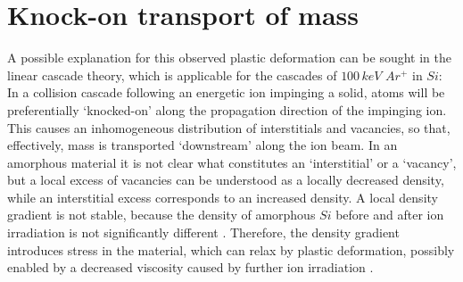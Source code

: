 \section{Knock-on transport of mass}

A possible explanation for this observed plastic deformation can be sought in the linear cascade theory, which is applicable for the cascades of $100\,keV\,\,Ar^+$ in $Si$: In a collision cascade following an energetic ion impinging a solid, atoms will be preferentially `knocked-on' along the propagation direction of the impinging ion. This causes an inhomogeneous distribution of interstitials and vacancies, so that, effectively, mass is transported `downstream' along the ion beam. In an amorphous material it is not clear what constitutes an `interstitial' or a `vacancy', but a local excess of vacancies can be understood as a locally decreased density, while an interstitial excess corresponds to an increased density. A local density gradient is not stable, because the density of amorphous $Si$ before and after ion irradiation is not significantly different \cite{pelaz_ion-beam-induced_2004}. Therefore, the density gradient introduces stress in the material, which can relax by plastic deformation, possibly enabled by a decreased viscosity caused by further ion irradiation \cite{snoeks_stress_1997,hu_burrowing_2002,mayr_mechanisms_2003,mayr_effect_2003}. 


